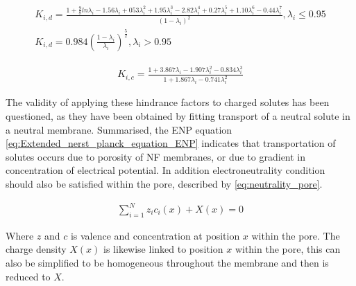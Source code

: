 {\small
\begin{ceqn} 
    \begin{align}
       K_{i,d}= \frac{1+\frac{9}{8}ln\lambda_i-1.56\lambda_i+053\lambda_i^2+1.95\lambda_i^3-2.82\lambda_i^4+0.27\lambda_i^5+1.10\lambda_i^6-0.44\lambda_i^7}{(1-\lambda_i)^2},\lambda_i \leq 0.95 \nonumber \\
       K_{i,d}= 0.984 (\frac{1-\lambda_i}{\lambda_i})^{\frac{5}{2}},\lambda_i > 0.95
              \label{eq:Diffusion_hindrance_factor}
    \end{align} 
\end{ceqn}  


}%
\begin{ceqn} 
    \begin{align}
       K_{i,c}= \frac{1+3.867\lambda_i-1.907\lambda_i^2-0.834\lambda_i^3}{1+1.867\lambda_i-0.741\lambda_i^2}
              \label{eq:Convection_hindrance_factor}
    \end{align} 
\end{ceqn}  


The validity of applying these hindrance factors to charged solutes has been questioned, as they have been obtained by fitting transport of a neutral solute in a neutral membrane. \citep{wangPoreModelNanofiltration2021} 
Summarised, the ENP equation \ref{eq:Extended_nerst_planck_equation_ENP} indicates that transportation of solutes occurs due to porosity of NF membranes, or due to gradient in concentration of electrical potential. \citep{MIT_2018_DSPM_DE_Fabrication}
In addition %
electroneutrality condition should also be satisfied within the pore, described by \cref{eq:neutrality_pore}. \citep{MIT_2018_DSPM_DE_Fabrication} \citep{wangPoreModelNanofiltration2021} 

\begin{ceqn} 
    \begin{align}
     \sum_{i=1}^{N} z_ic_i(x) + X(x) = 0 
              \label{eq:neutrality_pore}
    \end{align} 
\end{ceqn}  

Where $z$ and $c$ is valence and concentration at position $x$ within the pore. The charge density $X(x)$ is likewise linked to position $x$ within the pore, this can also be simplified to be homogeneous throughout the membrane and then is reduced to $X$. \citep{wangPoreModelNanofiltration2021}



